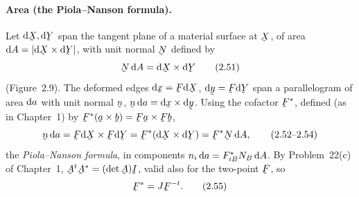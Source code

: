 \paragraph*{Area (the Piola--Nanson formula).}
Let $\dl\bX,\dl\bY$ span the tangent plane of a material surface at $\bX$,
of area $\dl A=|\dl\bX\times\dl\bY|$, with unit normal $\bN$ defined by
\begin{equation}
   \bN\,\dl A=\dl\bX\times\dl\bY \tag{2.51}\label{eq:2.51}
\end{equation}
(Figure~2.9). The deformed edges $\dl\bx=\bF\dl\bX$, $\dl\by=\bF\dl\bY$ span
a parallelogram of area $\mathrm{d} a$ with unit normal $\bn$, $\bn\,\dl a=\dl\bx
\times\dl\by$. Using the cofactor $\bF^{*}$, defined (as in Chapter~1) by
$\bF^{*}(\ba\times\bb)=\bF\ba\times\bF\bb$,
\begin{equation}
   \bn\,\dl a=\bF\dl\bX\times\bF\dl\bY=\bF^{*}(\dl\bX\times\dl\bY)
   =\bF^{*}\bN\,\dl A, \tag{2.52--2.54}\label{eq:2.52}
\end{equation}
the \emph{Piola--Nanson formula}, in components $n_i\,\mathrm{d} a=F^{*}_{iB}N_B\,\mathrm{d} A$.
By Problem~22(c) of Chapter~1, $\bA^{t}\bA^{*}=(\det\bA)\I$, valid also for
the two-point $\bF$, so
\begin{equation}
   \bF^{*}=J\bF^{-t}. \tag{2.55}\label{eq:2.55}
\end{equation}

